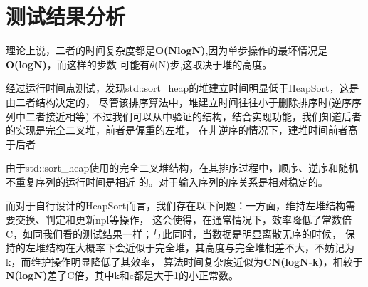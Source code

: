 \documentclass[UTF8]{ctexart}
\begin{document}
\section{测试结果分析}
理论上说，二者的时间复杂度都是\textbf{O(NlogN)},因为单步操作的最坏情况是\textbf{O(logN)}，而这样的步数
可能有\(\theta\)(N)步,这取决于堆的高度。\par
经过运行时间点测试，发现std::sort\_heap的堆建立时间明显低于HeapSort，这是由二者结构决定的，
尽管该排序算法中，堆建立时间往往小于删除排序时(逆序序列中二者接近相等)
不过我们可以从中验证的结构，结合实现功能，我们知道后者的实现是完全二叉堆，前者是偏重的左堆，
在非逆序的情况下，建堆时间前者高于后者\par
由于std::sort\_heap使用的完全二叉堆结构，在其排序过程中，顺序、逆序和随机不重复序列的运行时间是相近
的。对于输入序列的序关系是相对稳定的。\par
而对于自行设计的HeapSort而言，我们存在以下问题：一方面，维持左堆结构需要交换、判定和更新npl等操作，
这会使得，在通常情况下，效率降低了常数倍C，如同我们看的测试结果一样；与此同时，当数据是明显离散无序的时候，
保持的左堆结构在大概率下会近似于完全堆，其高度与完全堆相差不大，不妨记为k，而维护操作明显降低了其效率，
算法时间复杂度近似为\textbf{CN(logN-k)}，相较于\textbf{N(logN)}差了C倍，其中k和c都是大于1的小正常数。\par
\end{document}
